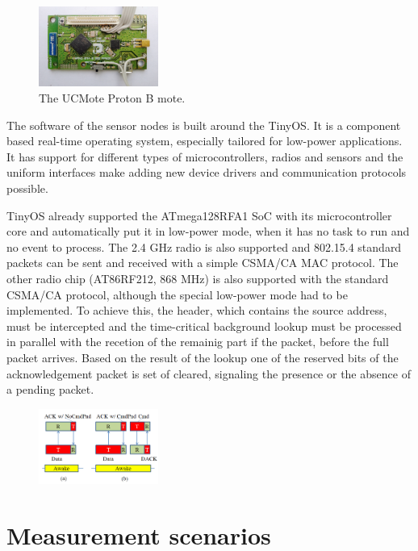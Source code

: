 \documentclass[conference]{IEEEtran}
\begin{document}
\begin{figure}[htbp]
	\centering
	\includegraphics[width=0.35\textwidth]{fig/ucproton.png}
  \caption{The UCMote Proton B mote. }
	\label{fig-proton}
\end{figure}

The software of the sensor nodes is built around the TinyOS. It is a component
based real-time operating system, especially tailored for low-power
applications. It has support for different types of microcontrollers, radios
and sensors and the uniform interfaces make adding new device drivers and
communication protocols possible.

\cite{vakulya2013}

TinyOS already supported the ATmega128RFA1 SoC with its microcontroller core
and automatically put it in low-power mode, when it has no task to run and no
event to process. The 2.4 GHz radio is also supported and 802.15.4 standard
packets can be sent and received with a simple CSMA/CA MAC protocol. The other
radio chip (AT86RF212, 868 MHz) is also supported with the standard CSMA/CA
protocol, although the special low-power mode had to be implemented. To achieve this,
the header, which contains the source address, must be intercepted and the
time-critical background lookup must be processed in parallel with the recetion
of the remainig part if the packet, before the full packet arrives. Based on
the result of the lookup one of the reserved bits of the acknowledgement packet
is set of cleared, signaling the presence or the absence of a pending packet.

\begin{figure}[htbp]
	\centering
	\includegraphics[width=0.35\textwidth]{fig/protocol.png}
  \caption{}
	\label{fig-piggyback}
\end{figure}

\section{Measurement scenarios}
\end{document}
